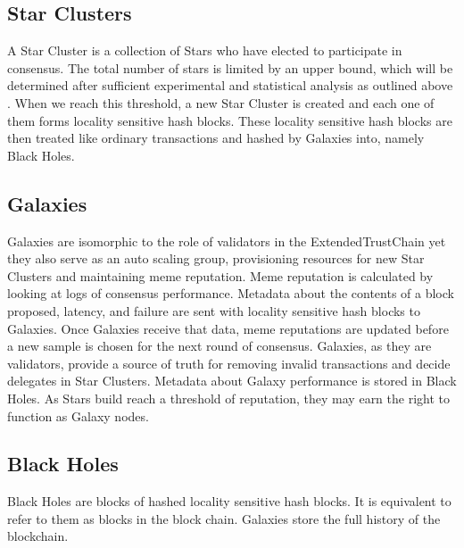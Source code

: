 \documentclass{article}
\begin{document}
\subsection{Star Clusters}
A Star Cluster is a collection of Stars who have elected to participate in consensus. The total number of stars is limited by an upper bound, which will be determined after sufficient experimental and statistical analysis as outlined above  . When we reach this threshold, a new Star Cluster is created and each one of them forms locality sensitive hash blocks. These locality sensitive hash blocks are then treated like ordinary transactions and hashed by Galaxies into, namely Black Holes.

\subsection{Galaxies}
Galaxies are isomorphic to the role of validators in the ExtendedTrustChain yet they also serve as an auto scaling group, provisioning resources for new Star Clusters and maintaining meme reputation. Meme reputation is calculated by looking at logs of consensus performance. Metadata about the contents of a block proposed, latency, and failure are sent with locality sensitive hash blocks to Galaxies. Once Galaxies receive that data, meme reputations are updated before a new sample is chosen for the next round of consensus. Galaxies, as they are validators, provide a source of truth for removing invalid transactions and decide delegates in Star Clusters. Metadata about Galaxy performance is stored in Black Holes. As Stars build reach a threshold of reputation, they may earn the right to function as Galaxy nodes.

\subsection{Black Holes}
Black Holes are blocks of hashed locality sensitive hash blocks. It is equivalent to refer to them as blocks in the block chain. Galaxies store the full history of the blockchain.
\end{document}
